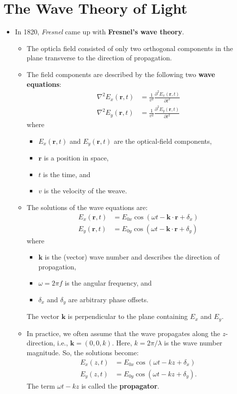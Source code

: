 \documentclass[10pt]{article}
\newcommand{\ve}[1]{\mathbf{#1}}
\begin{document}
	\section{The Wave Theory of Light}
	\begin{itemize}
		\item In 1820, \emph{Fresnel} came up with \textbf{Fresnel's wave theory}.
		\begin{itemize}
			\item  The opticla field consisted of only two orthogonal components in the plane transverse to the direction of propagation.
			\item The field components are described by the following two \textbf{wave equations}:
			\begin{align*}
				\nabla^2 E_x(\ve{r}, t) &= \frac{1}{v^2} \frac{\partial^2 E_x(\ve{r},t)}{\partial t^2} \\
				\nabla^2 E_y(\ve{r}, t) &= \frac{1}{v^2} \frac{\partial^2 E_y(\ve{r},t)}{\partial t^2}
			\end{align*}
			where
			\begin{itemize}
			 	\item $E_x(\ve{r},t)$ and $E_y(\ve{r},t)$ are the optical-field components, 
			 	\item $\ve{r}$ is a position in space,
			 	\item $t$ is the time, and
			 	\item $v$ is the velocity of the weave.
			\end{itemize}

			\item The solutions of the wave equations are:
			\begin{align*}
				E_x(\ve{r},t) &= E_{0x}\cos(\omega t - \ve{k} \cdot \ve{r} + \delta_x) \\
				E_y(\ve{r},t) &= E_{0y}\cos(\omega t - \ve{k} \cdot \ve{r} + \delta_y)
			\end{align*}
			where
			\begin{itemize}
			 	\item $\ve{k}$ is the (vector) wave number and describes the direction of propagation, 
			 	\item $\omega = 2\pi f$ is the angular frequency, and
			 	\item $\delta_x$ and $\delta_y$ are arbitrary phase offsets.
			\end{itemize} 
			The vector $\ve{k}$ is perpendicular to the plane containing $E_x$ and $E_y$.

			\item In practice, we often assume that the wave propagates along the $z$-direction, i.e., $\ve{k} = (0,0,k)$.  Here, $k = 2\pi/\lambda$ is the wave number magnitude.  So, the solutions become:
			\begin{align*}
				E_x(z,t) &= E_{0x} \cos(\omega t - kz + \delta_x) \\
				E_y(z,t) &= E_{0y} \cos(\omega t - kz + \delta_y).
			\end{align*} 
			The term $\omega t - kz$ is called the \textbf{propagator}.


\end{itemize}
\end{itemize}
\end{document}
